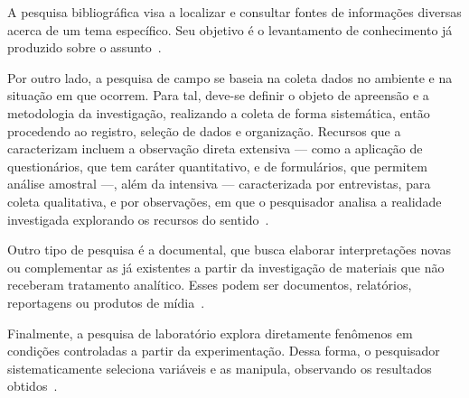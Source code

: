 A pesquisa bibliográfica visa a localizar e consultar fontes de informações diversas acerca de um tema específico.
Seu objetivo é o levantamento de conhecimento já produzido sobre o assunto~\cite{liamara_pesquisa}.

Por outro lado, a pesquisa de campo se baseia na coleta dados no ambiente e na situação em que ocorrem.
Para tal, deve-se definir o objeto de apreensão e a metodologia da investigação, realizando a coleta de forma sistemática, então procedendo ao registro, seleção de dados e organização.
Recursos que a caracterizam incluem a observação direta extensiva --- como a aplicação de questionários, que tem caráter quantitativo, e de formulários, que permitem análise amostral ---, além da intensiva --- caracterizada por entrevistas, para coleta qualitativa, e por observações, em que o pesquisador analisa a realidade investigada explorando os recursos do sentido~\cite{liamara_pesquisa}.

Outro tipo de pesquisa é a documental, que busca elaborar interpretações novas ou complementar as já existentes a partir da investigação de materiais que não receberam tratamento analítico.
Esses podem ser documentos, relatórios, reportagens ou produtos de mídia~\cite{liamara_pesquisa}.

Finalmente, a pesquisa de laboratório explora diretamente fenômenos em condições controladas a partir da experimentação.
Dessa forma, o pesquisador sistematicamente seleciona variáveis e as manipula, observando os resultados obtidos~\cite{liamara_pesquisa}.
